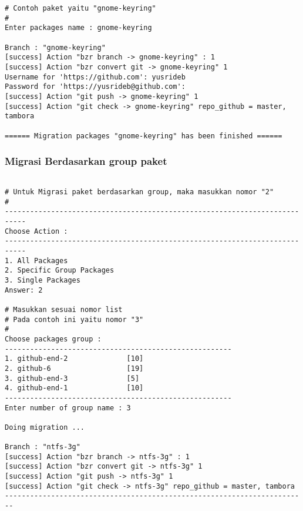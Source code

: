 {\begin{lstlisting}[language=ShellBash2]
# Contoh paket yaitu "gnome-keyring"
# 
Enter packages name : gnome-keyring

Branch : "gnome-keyring"
[success] Action "bzr branch -> gnome-keyring" : 1
[success] Action "bzr convert git -> gnome-keyring" 1
Username for 'https://github.com': yusrideb
Password for 'https://yusrideb@github.com': 
[success] Action "git push -> gnome-keyring" 1
[success] Action "git check -> gnome-keyring" repo_github = master, tambora

====== Migration packages "gnome-keyring" has been finished ======
\end{lstlisting}

\subsubsection{Migrasi Berdasarkan group paket}

\begin{lstlisting}[language=ShellBash2]

# Untuk Migrasi paket berdasarkan group, maka masukkan nomor "2"
#
---------------------------------------------------------------------------
Choose Action : 
---------------------------------------------------------------------------
1. All Packages
2. Specific Group Packages
3. Single Packages
Answer: 2

# Masukkan sesuai nomor list
# Pada contoh ini yaitu nomor "3"
#
Choose packages group : 
------------------------------------------------------
1. github-end-2              [10]
2. github-6                  [19]
3. github-end-3              [5]
4. github-end-1              [10]
------------------------------------------------------
Enter number of group name : 3

Doing migration ...

Branch : "ntfs-3g"
[success] Action "bzr branch -> ntfs-3g" : 1
[success] Action "bzr convert git -> ntfs-3g" 1
[success] Action "git push -> ntfs-3g" 1
[success] Action "git check -> ntfs-3g" repo_github = master, tambora
------------------------------------------------------------------------


\end{lstlisting}}
